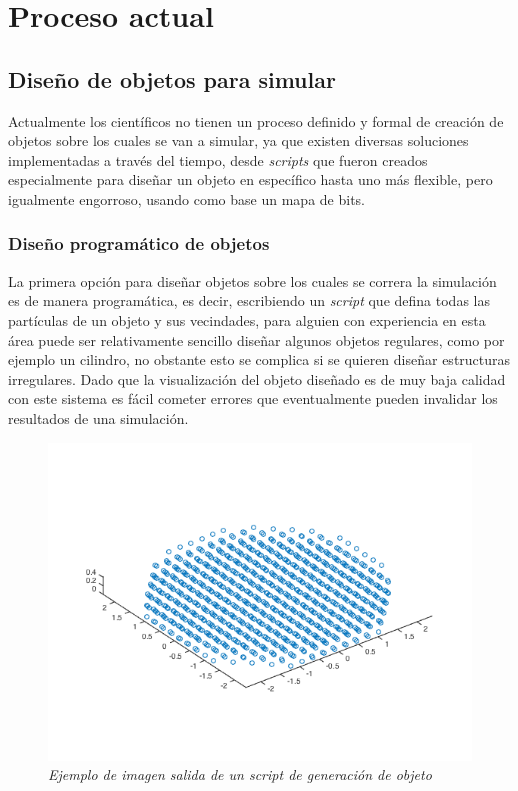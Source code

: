 \section{Proceso actual}

\subsection{Diseño de objetos para simular}

Actualmente los científicos no tienen un proceso definido y formal de creación de objetos sobre los cuales se van a simular, ya que existen diversas soluciones implementadas a través del tiempo, desde \emph{scripts} que fueron creados especialmente para diseñar un objeto en específico hasta uno más flexible, pero igualmente engorroso, usando como base un mapa de bits.


\subsubsection{Diseño programático de objetos}

La primera opción para diseñar objetos sobre los cuales se correra la simulación es de manera programática, es decir, escribiendo un \emph{script} que defina todas las partículas de un objeto y sus vecindades, para alguien con experiencia en esta área puede ser relativamente sencillo diseñar algunos objetos regulares, como por ejemplo un cilindro, no obstante esto se complica si se quieren diseñar estructuras irregulares. Dado que la visualización del objeto diseñado es de muy baja calidad con este sistema es fácil cometer errores que eventualmente pueden invalidar los resultados de una simulación.

\begin{figure}[H]
  \centering
  \includegraphics[scale=.6]{images/procesoActualScript}
  \caption{\em Ejemplo de imagen salida de un \emph{script} de generación de objeto}
\end{figure}

